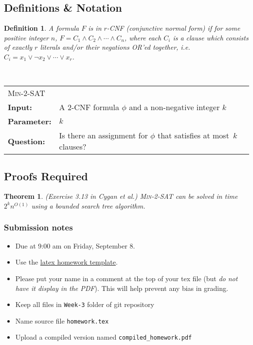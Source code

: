 \documentclass{article}
\newcommand{\defproblem}[4]{%
  \hfill\\\smallskip\noindent%
  \begin{tabularx}{\textwidth}{|l X|}%
    \hline%
    \multicolumn{2}{|l|}{\pname{#1}}\\%
    \textbf{Input:}&#2\\%
    \textbf{Parameter:}&#3\\%
    \textbf{Question:}&#4\smallskip\\\hline%
  \end{tabularx}%
  \smallskip%
}%
\newcommand{\pname}[1]{\textnormal{\textsc{#1}}}
\newtheorem*{theorem}{Theorem}
\newtheorem{definition}{Definition}
\begin{document}
\subsection*{Definitions \& Notation}
\begin{definition}
A formula $F$ is in \emph{$r$-CNF} (conjunctive normal form) if for some positive
integer $n$, $F = C_1 \land C_2 \land \cdots \land C_n$, where each $C_i$ is a \emph{clause} which
consists of exactly $r$ literals and/or their negations \textsc{OR}'ed together, i.e.
$C_i = x_1 \lor \neg x_2 \lor \cdots \lor x_r$.
\end{definition}


\defproblem{Min-$2$-SAT}
%
{A 2-CNF formula $\phi$ and a non-negative integer $k$}
%
{$k$}
%
{Is there an assignment for $\phi$ that satisfies at most~$k$ clauses?}
%


\subsection*{Proofs Required}

\begin{theorem} ({\small Exercise 3.13 in Cygan et al.}) \pname{Min-2-SAT} can be solved in
  time $2^kn^{O(1)}$ using a bounded search tree algorithm.
\end{theorem}


\vfill

\subsubsection*{Submission notes}
\begin{itemize}
\item Due at 9:00 am on Friday, September 8.
\item Use the \href{https://github.com/bdsullivan/ParameterizedAlgorithms-Fall2017/tree/master/templates/homework}{latex homework template}.
\item Please put your name in a comment at the top of your tex file (but {\it do not
have it display in the PDF}). This will help prevent any bias in grading.
\item Keep all files in \texttt{Week-3} folder of git repository
\item Name source file \texttt{homework.tex}
\item Upload a compiled version named \texttt{compiled\_homework.pdf}
\end{itemize}
\end{document}
